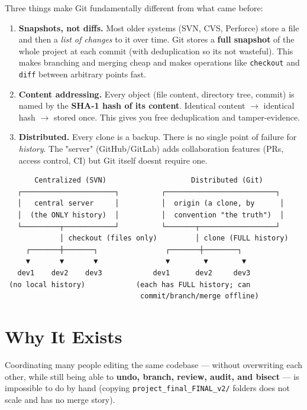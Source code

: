 \documentclass[11pt]{article}
\providecommand{\tightlist}{\setlength{\itemsep}{1pt}\setlength{\parskip}{0pt}}
\begin{document}
Three things make Git fundamentally different from what came before:

\begin{enumerate}
\def\labelenumi{\arabic{enumi}.}
\tightlist
\item
  \textbf{Snapshots, not diffs.} Most older systems (SVN, CVS, Perforce) store a file and then a \emph{list of changes} to it over time. Git stores a \textbf{full snapshot} of the whole project at each commit (with deduplication so it\textquotesingle s not wasteful). This makes branching and merging cheap and makes operations like \texttt{checkout} and \texttt{diff} between arbitrary points fast.
\item
  \textbf{Content addressing.} Every object (file content, directory tree, commit) is named by the \textbf{SHA-1 hash of its content}. Identical content \(\rightarrow\) identical hash \(\rightarrow\) stored once. This gives you free deduplication and tamper-evidence.
\item
  \textbf{Distributed.} Every clone is a backup. There is no single point of failure for \emph{history}. The "server" (GitHub/GitLab) adds collaboration features (PRs, access control, CI) but Git itself doesn\textquotesingle t require one.
\end{enumerate}

\setcodelang{}

\begin{verbatim}
       Centralized (SVN)                    Distributed (Git)
   ┌──────────────────────┐          ┌──────────────────────────┐
   │   central server     │          │  origin (a clone, by      │
   │  (the ONLY history)  │          │  convention "the truth")  │
   └─────────┬────────────┘          └───────┬──────────────────┘
             │ checkout (files only)         │ clone (FULL history)
     ┌───────┼───────┐                ┌───────┼────────┐
     ▼       ▼       ▼                ▼        ▼        ▼
   dev1    dev2    dev3            dev1      dev2     dev3
 (no local history)            (each has FULL history; can
                                commit/branch/merge offline)
\end{verbatim}

\section{Why It Exists}\label{why-it-exists}

Coordinating many people editing the same codebase --- without overwriting each other, while still being able to \textbf{undo, branch, review, audit, and bisect} --- is impossible to do by hand (copying \texttt{project\_final\_FINAL\_v2/} folders does not scale and has no merge story).
\end{document}
